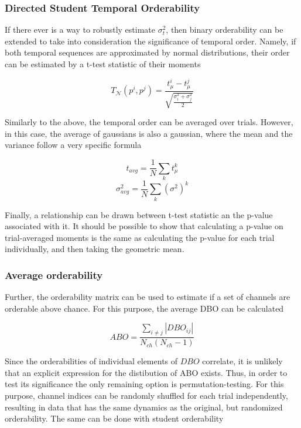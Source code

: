\documentclass[a4paper,10pt]{article}
\begin{document}
\subsubsection{Directed Student Temporal Orderability}

If there ever is a way to robustly estimate $\sigma^2_t$, then binary 
orderability can be extended to take into consideration the significance of 
temporal order. Namely, if both temporal sequences are approximated by normal 
distributions, their order can be estimated by a t-test statistic of their 
moments

\begin{equation}
    T_{\mathcal{N}}(p^i, p^j) = \frac{t_{\mu}^i - 
t_{\mu}^j}{\sqrt{\frac{\sigma_i^2 + \sigma_j^2}{2}}}
\end{equation}

Similarly to the above, the temporal order can be averaged over trials. 
However, in this case, the average of gaussians is also a gaussian, where the 
mean and the variance follow a very specific formula

$$ t_{avg} = \frac{1}{N}\sum_k t^k_{\mu} $$
$$ \sigma^2_{avg} = \frac{1}{N}\sum_k (\sigma^2)^k $$

Finally, a relationship can be drawn between t-test statistic an the p-value 
associated with it. It should be possible to show that calculating a p-value on 
trial-averaged moments is the same as calculating the p-value for each trial 
individually, and then taking the geometric mean.

\subsubsection{Average orderability}

Further, the orderability matrix can be used to estimate if a set of channels 
are orderable above chance. For this purpose, the average DBO can be calculated

$$ABO = \frac{\sum_{i\neq j} |DBO_{ij}|}{N_{ch}(N_{ch} - 1)}$$

Since the orderabilities of individual elements of $DBO$ correlate, it is 
unlikely that an explicit expression for the distibution of ABO exists. Thus, 
in order to test its significance the only remaining option is 
permutation-testing. For this purpose, channel indices can be randomly 
shuffled for each trial independently, resulting in data that has the same 
dynamics as the original, but randomized orderability. The same can be done 
with student orderability
\end{document}
